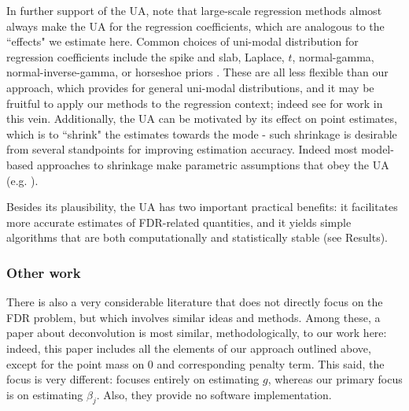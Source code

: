 \documentclass[11pt]{article}
\begin{document}

In further support of the UA, note that large-scale regression methods almost always make the UA for the regression coefficients,
which are analogous to the ``effects" we estimate here. 
Common choices of uni-modal distribution for regression coefficients 
include the spike and slab, Laplace, $t$, normal-gamma, normal-inverse-gamma, or horseshoe priors \cite{carvalho2010horseshoe}.
These are all less flexible than our approach, which provides for general uni-modal distributions, and 
it may be fruitful to apply our methods to the regression context; indeed see \cite{moser:2015} for work in this vein. 
Additionally, the UA can be motivated by its effect on point estimates, which is to ``shrink" the estimates towards the mode - 
such shrinkage is desirable from several standpoints for improving estimation accuracy. Indeed most model-based approaches to shrinkage
make parametric assumptions that obey the UA (e.g. \cite{johnstone2004needles}).

Besides its plausibility, the UA has two important practical benefits: it facilitates more accurate estimates
of FDR-related quantities, and it yields simple algorithms that are both computationally
and statistically stable (see Results).

\subsubsection*{Other work}

There is also a very considerable literature that does not directly focus on the FDR problem, but which involves similar ideas and methods. 
 Among these, a paper about deconvolution \cite{cordy1997deconvolution} is most similar, methodologically, to our work here:
indeed, this paper includes all the elements of our approach outlined above, except for the point mass on 0 and corresponding penalty term.
This said, the focus is very different: \cite{cordy1997deconvolution} focuses entirely on estimating $g$, whereas our primary focus is on estimating $\beta_j$.
Also, they provide no software implementation.  
\end{document}
